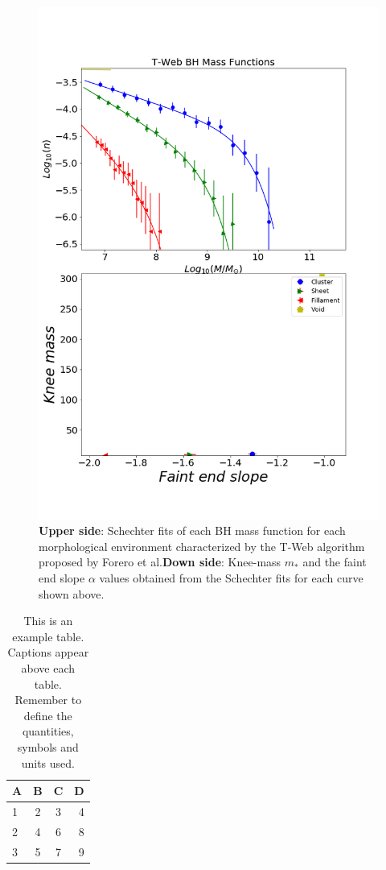 \documentclass[a4paper,fleqn,usenatbib]{mnras}
\begin{document}
\begin{figure}
	\includegraphics[width=\columnwidth]{./pics/T-Web_BH.png}
    \caption{\textbf{Upper side}: Schechter fits of each BH mass
      function for each morphological environment characterized by the
      T-Web algorithm proposed by Forero et al.\textbf{Down side}:
      Knee-mass $m_\ast$ and the faint end slope $\alpha$ values
      obtained from the Schechter fits for each curve shown above.} 
    \label{fig:TwebBH}
\end{figure}

\begin{table}
	\centering
	\caption{This is an example table. Captions appear above each table.
	Remember to define the quantities, symbols and units used.}
	\label{tab:example_table}
	\begin{tabular}{lccr} %
		\hline
		A & B & C & D\\
		\hline
		1 & 2 & 3 & 4\\
		2 & 4 & 6 & 8\\
		3 & 5 & 7 & 9\\
		\hline
	\end{tabular}
\end{table}
\end{document}
